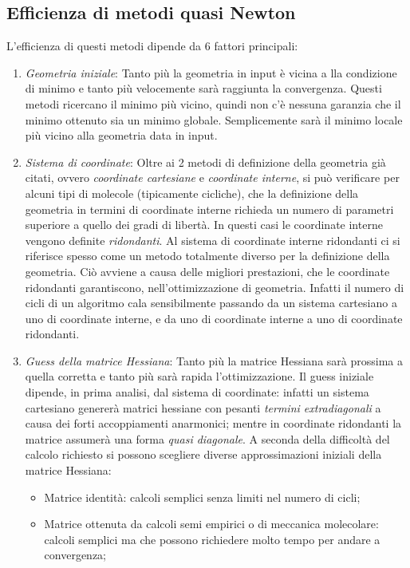\documentclass[oneside]{amsbook}
\numberwithin{section}{chapter}
\numberwithin{equation}{section}
\numberwithin{figure}{section}
\begin{document}
\subsection{Efficienza di metodi quasi Newton} 
L'efficienza di questi metodi dipende da 6 fattori principali:
\begin{enumerate}
\item \emph{Geometria iniziale}: Tanto più la geometria in input è vicina a lla condizione di minimo e tanto più velocemente sarà raggiunta la convergenza. Questi metodi ricercano il minimo più vicino, quindi non c'è nessuna garanzia che il minimo ottenuto sia un minimo globale. Semplicemente sarà il minimo locale più vicino alla geometria data in input.
\item \emph{Sistema di coordinate}: Oltre ai 2 metodi di definizione della geometria già citati, ovvero \emph{coordinate cartesiane} e \emph{coordinate interne}, si può verificare per alcuni tipi di molecole (tipicamente cicliche), che la definizione della geometria in termini di coordinate interne richieda un numero di parametri superiore a quello dei gradi di libertà. In questi casi le coordinate interne vengono definite \emph{ridondanti}. Al sistema di coordinate interne ridondanti ci si riferisce spesso come un metodo totalmente diverso per la definizione della geometria. Ciò avviene a causa delle migliori prestazioni, che le coordinate ridondanti garantiscono, nell'ottimizzazione di geometria. Infatti il numero di cicli di un algoritmo cala sensibilmente passando da un sistema cartesiano a uno di coordinate interne, e da uno di coordinate interne a uno di coordinate ridondanti.
\item \emph{Guess della matrice Hessiana}: Tanto più la matrice Hessiana sarà prossima a quella corretta e tanto più sarà rapida l'ottimizzazione. Il guess iniziale dipende, in prima analisi, dal sistema di coordinate: infatti un sistema cartesiano genererà matrici hessiane con pesanti \emph{termini extradiagonali} a causa dei forti accoppiamenti anarmonici; mentre in coordinate ridondanti la matrice assumerà una forma \emph{quasi diagonale}. A seconda della difficoltà del calcolo richiesto si possono scegliere diverse approssimazioni iniziali della matrice Hessiana:
\begin{itemize}
\item Matrice identità: calcoli semplici senza limiti nel numero di cicli;
\item Matrice ottenuta da calcoli semi empirici o di meccanica molecolare: calcoli semplici ma che possono richiedere molto tempo per andare a convergenza;

\end{itemize}
\end{enumerate}
\end{document}
